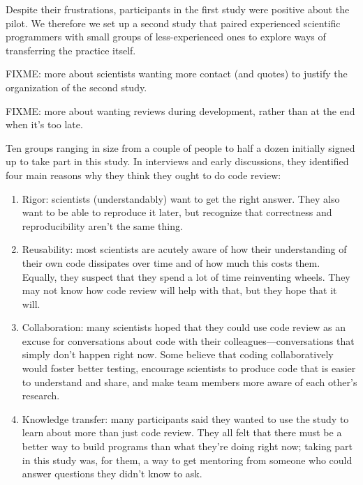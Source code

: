\documentclass[10pt,twocolumn]{article}
\begin{document}
Despite their frustrations,
participants in the first study were positive about the pilot.
We therefore we set up a second study
that paired experienced scientific programmers with small groups of less-experienced ones
to explore ways of transferring the practice itself.

FIXME: more about scientists wanting more contact (and quotes) to justify the organization of the second study.

FIXME: more about wanting reviews during development, rather than at the end when it's too late.

Ten groups ranging in size from a couple of people to half a dozen initially signed up to take part in this study.
In interviews and early discussions,
they identified four main reasons why they think they ought to do code review:

\begin{enumerate}

\item Rigor:
scientists (understandably) want to get the right answer.
They also want to be able to reproduce it later, but recognize that correctness and reproducibility aren't the same thing.

\item Reusability:
most scientists are acutely aware of how their understanding of their own code dissipates over time and of how much this costs them.
Equally, they suspect that they spend a lot of time reinventing wheels.
They may not know how code review will help with that, but they hope that it will.

\item Collaboration:
many scientists hoped that they could use code review
as an excuse for conversations about code with their colleagues---conversations that simply don't happen right now.
Some believe that coding collaboratively would foster better testing,
encourage scientists to produce code that is easier to understand and share,
and make team members more aware of each other's research.

\item Knowledge transfer:
many participants said they wanted to use the study to learn about more than just code review.
They all felt that there must be a better way to build programs than what they're doing right now;
taking part in this study was, for them,
a way to get mentoring from someone who could answer questions they didn't know to ask.

\end{enumerate}
\end{document}
